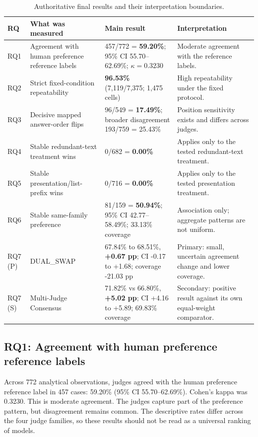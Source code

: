 \documentclass[11pt,a4paper]{article}
\renewcommand{\arraystretch}{1.14}
\begin{document}
\begin{table}[H]
\centering
\footnotesize
\renewcommand{\arraystretch}{1.12}
\caption{Authoritative final results and their interpretation boundaries.}
\begin{tabularx}{\textwidth}{@{}p{}p{}p{}X@{}}
\toprule
RQ & What was measured & Main result & Interpretation \\
\midrule
RQ1 & Agreement with human preference reference labels & 457/772 = \textbf{59.20\%}; 95\% CI 55.70--62.69\%; $\kappa=0.3230$ & Moderate agreement with the reference labels.\\
RQ2 & Strict fixed-condition repeatability & \textbf{96.53\%} (7,119/7,375; 1,475 cells) & High repeatability under the fixed protocol.\\
RQ3 & Decisive mapped answer-order flips & 96/549 = \textbf{17.49\%}; broader disagreement 193/759 = 25.43\% & Position sensitivity exists and differs across judges.\\
RQ4 & Stable redundant-text treatment wins & 0/682 = \textbf{0.00\%} & Applies only to the tested redundant-text treatment.\\
RQ5 & Stable presentation/list-prefix wins & 0/716 = \textbf{0.00\%} & Applies only to the tested presentation treatment.\\
RQ6 & Stable same-family preference & 81/159 = \textbf{50.94\%}; 95\% CI 42.77--58.49\%; 33.13\% coverage & Association only; aggregate patterns are not uniform.\\
RQ7 (P) & DUAL\_SWAP & 67.84\% to 68.51\%, \textbf{+0.67 pp}; CI -0.17 to +1.68; coverage -21.03 pp & Primary: small, uncertain agreement change and lower coverage.\\
RQ7 (S) & Multi-Judge Consensus & 71.82\% vs 66.80\%, \textbf{+5.02 pp}; CI +4.16 to +5.89; 69.83\% coverage & Secondary: positive result against its own equal-weight comparator.\\
\bottomrule
\end{tabularx}
\end{table}

\subsection*{RQ1: Agreement with human preference reference labels}

Across 772 analytical observations, judges agreed with the human preference reference label in 457 cases: 59.20\% (95\% CI 55.70--62.69\%). Cohen's kappa was 0.3230. This is moderate agreement. The judges capture part of the preference pattern, but disagreement remains common. The descriptive rates differ across the four judge families, so these results should not be read as a universal ranking of models.
\end{document}
